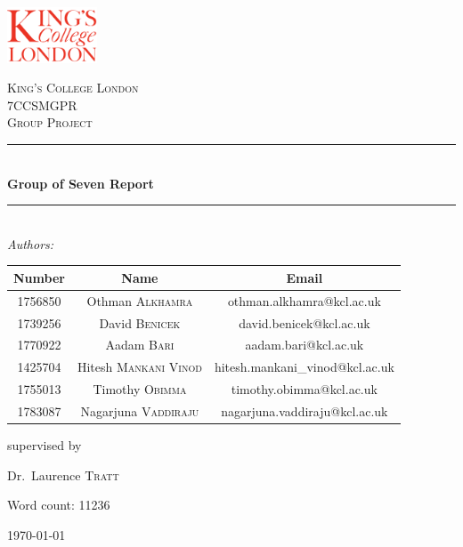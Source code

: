 \documentclass[a4paper]{report}
\begin{document}
	\begin{titlepage}
		\newcommand{\HRule}{\rule{\linewidth}{0.5mm}} %
		\newcommand{\hRule}{\rule{\linewidth}{0.1mm}} %
		\centering
		\includegraphics[width=0.2\textwidth]{kcl.png}\par\vspace{1cm}
		\textsc{\LARGE King's College London}\\[1.5cm] %
		\textsc{\large 7CCSMGPR}\\[0.5cm] %
		\textsc{\Large Group Project}\\[0.5cm] %
		\HRule\\[0.4cm]
		{\huge\bfseries Group of Seven Report}\\[0.4cm] %
		\HRule\\[1.5cm]
		\vspace{1cm}
		\textit{Authors: }\vspace{0.5cm}
		\begin{center}
			\begin{tabular}{ c|c|c } 
				\hline
				\textbf{Number} & \textbf{Name} & \textbf{Email} \\
				\hline
				1756850 & Othman \textsc{Alkhamra} &  othman.alkhamra@kcl.ac.uk \\ 
				\hline
				1739256 & David \textsc{Benicek} &  david.benicek@kcl.ac.uk \\ 
				\hline
				1770922 & Aadam \textsc{Bari} &  
				aadam.bari@kcl.ac.uk\\ 
				\hline
				1425704 & Hitesh \textsc{Mankani Vinod} &  hitesh.mankani\_vinod@kcl.ac.uk \\ 
				\hline
				1755013 & Timothy \textsc{Obimma} &  timothy.obimma@kcl.ac.uk \\ 
				\hline
				1783087 & Nagarjuna \textsc{Vaddiraju} &  nagarjuna.vaddiraju@kcl.ac.uk \\ 
				
				\hline
			\end{tabular}
		\end{center}
		
		\vfill
		supervised by\par
		Dr.~Laurence \textsc{Tratt}\par
		Word count: 11236
		\vfill
		{\large \today\par}
	\end{titlepage}
	\newpage
	\tableofcontents
	\newpage
\end{document}

